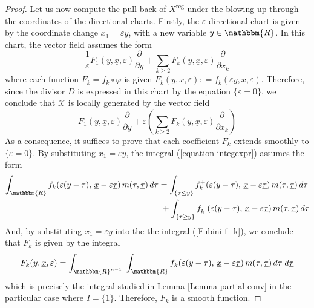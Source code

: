 \documentclass[10pt,a4paper]{amsart}
\newcommand{\cR}{\ensuremath{\mathbbm{R}}}
\newcommand{\eps}{\varepsilon }
\newcommand{\reg}{\mathrm{reg}}
\newcommand{\vf}{f}
\begin{document}
\begin{proof}
Let us now compute the pull-back of $X^\reg$ under the blowing-up through the coordinates of the directional charts.  Firstly, the $\eps$-directional chart is given by the coordinate change $x_1 = \eps  y$, with a new variable $y\in \cR$.  In this chart, the vector field assumes the form 
\[ 
 \frac{1}{\eps } F_1 \left( y, \underline{x}, \eps 
   \right) \frac{\partial}{\partial y} + \sum_{k \ge  2} F_k \left( y,
   \underline{x}, \eps  \right) \frac{\partial}{\partial x_k} \]
where each function $F_k = f_k \circ \varphi$ is given $F_k \left( y, \underline{x}, \eps  \right) : = f_k \left(
\eps  y, \underline{x}, \eps  \right)$. Therefore, since the divisor $D$ is expressed in this chart by the equation $\{\eps = 0\}$, we conclude that ${\mathcal{X}}$ 
is locally generated by the vector field
\begin{equation}\label{expression-calX}
  F_1 \left( y, \underline{x}, \eps 
   \right) \frac{\partial}{\partial y} + \eps \left(\sum_{k \ge  2} F_k \left( y,
   \underline{x}, \eps  \right) \frac{\partial}{\partial x_k}\right)
\end{equation}
As a consequence, it suffices to prove that each coefficient $F_k$ extends smoothly to $\{\eps = 0\}$. 
By substituting $x_1=\eps  y$, the integral (\ref{equation-integexpr}) assumes the form
\begin{align}\label{equation-integexprF}
\int_{\cR} 
   \vf_k\!\left( \eps  (y - \tau), \, \underline{x} - \eps  \underline{\tau} \right) 
   m \!\left( \tau, \underline{\tau} \right) d\tau
   &= \int_{\{ \tau \le  y \}} 
        \vf_k^+ \!\left( \eps  (y - \tau), \, \underline{x} - \eps  \underline{\tau} \right) 
        m \!\left( \tau, \underline{\tau} \right) d\tau  \\
   &\; + \int_{\{ \tau \ge  y \}} 
        \vf_k^- \!\left( \eps  (y - \tau), \, \underline{x} - \eps  \underline{\tau} \right) 
        m \!\left( \tau, \underline{\tau} \right) d\tau \notag
\end{align}
And, by substituting $x_1=\eps  y$ into the the integral (\ref{Fubini-f_k}), we conclude that $F_k$ is given by the integral
$$
F_k(y,\underline{x},\eps) = \int_{\cR^{n-1}} \; \int_{\cR} 
   \vf_k\!\left( \eps  (y - \tau), \, \underline{x} - \eps  \underline{\tau} \right) 
   m \!\left( \tau, \underline{\tau} \right) d\tau\; d\underline{\tau}
$$
which is precisely the integral studied in Lemma \ref{Lemma-partial-conv} in the particular case where $I=\{1\}$. Therefore, $F_k$ is a smooth function. 


\end{proof}
\end{document}
